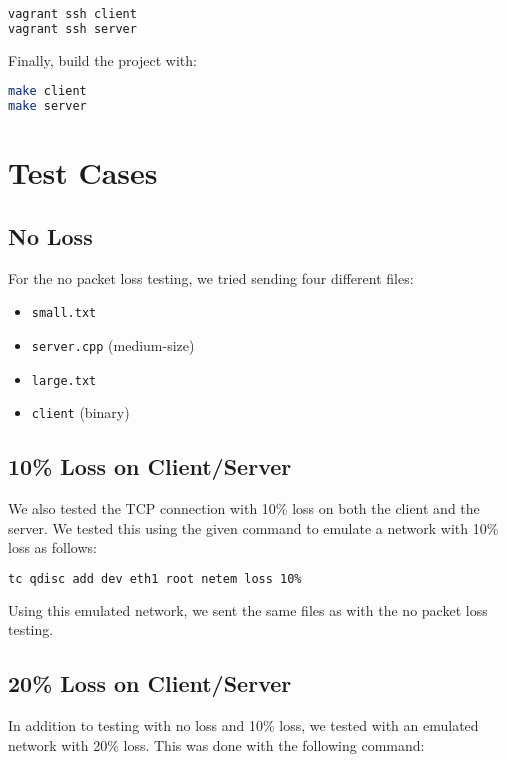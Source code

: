 \documentclass{article}
\begin{document}
\begin{lstlisting}[language=bash]
vagrant ssh client
vagrant ssh server
\end{lstlisting} 

\noindent
Finally, build the project with:

\begin{lstlisting}[language=bash]
make client
make server
\end{lstlisting}

\section{Test Cases}

\subsection{No Loss}

For the no packet loss testing, we tried sending four different files:

\begin{itemize}
	\item \texttt{small.txt}
	\item \texttt{server.cpp} (medium-size)
	\item \texttt{large.txt}
	\item \texttt{client} (binary)
\end{itemize}

\subsection{10\% Loss on Client/Server}

We also tested the TCP connection with 10\% loss on both the client and the server. We tested this using the given command to emulate a network with 10\% loss as follows:

\begin{lstlisting}[language=bash]
tc qdisc add dev eth1 root netem loss 10%
\end{lstlisting}

\noindent
Using this emulated network, we sent the same files as with the no packet loss testing.

\subsection{20\% Loss on Client/Server}

In addition to testing with no loss and 10\% loss, we tested with an emulated network with 20\% loss. This was done with the following command:
\end{document}
